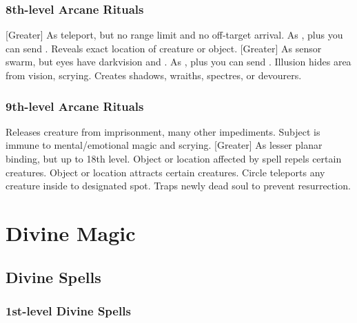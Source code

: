 \subsubsection{8th-level Arcane Rituals}
\begin{rituallist}
    [Greater] As teleport, but no range limit and no off-target arrival.
     As , plus you can send .
     Reveals exact location of creature or object.
    [Greater] As sensor swarm, but eyes have darkvision and .
     As , plus you can send .
     Illusion hides area from vision, scrying.
    \M Creates shadows, wraiths, spectres, or devourers.
\end{rituallist}

\subsubsection{9th-level Arcane Rituals}
\begin{rituallist}
     Releases creature from imprisonment, many other impediments.
     Subject is immune to mental/emotional magic and scrying.
    [Greater] As lesser planar binding, but up to 18th level.
     Object or location affected by spell repels certain creatures.
    \F Object or location attracts certain creatures.
     Circle teleports any creature inside to designated spot.
    \F Traps newly dead soul to prevent resurrection.
\end{rituallist}

\section{Divine Magic}\label{Divine Magic}

\subsection{Divine Spells}\label{Divine Spells}

\subsubsection{1st-level Divine Spells}
\begin{spelllist}
    \SLbane
    \SLbless
    \SLcommand
    \SLcurelightwounds
    \SLdivinefavor
    \SLentropicshield
    \SLinflictlightwounds
    \SLregenerationlesser
    \SLresistenergy
    \SLsanctuary
    \SLshieldoffaith
    \SLsummonmonsteri
\end{spelllist}

